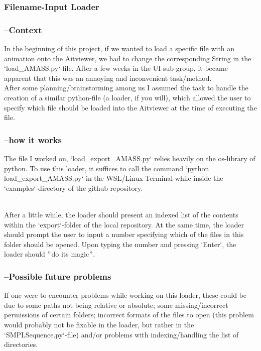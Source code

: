 \documentclass[a4paper]{scrartcl}
\begin{document}
\subsubsection*{Filename-Input Loader}
\subsubsection*{--Context}
In the beginning of this project, if we wanted to load a specific file with an animation onto the Aitviewer, we had to change the corresponding String in the `load\_AMASS.py`-file. After a few weeks in the UI sub-group, it became apparent that this was an annoying and inconvenient task/method.
\\
After some planning/brainstorming among us I assumed the task to handle the creation of a similar python-file (a loader, if you will), which allowed the user to specify which file should be loaded into the Aitviewer at the time of executing the file.

\subsubsection*{--how it works}
The file I worked on, `load\_export\_AMASS.py` relies heavily on the os-library of python.
To use this loader, it suffices to call the command `python load\_export\_AMASS.py` in the WSL/Linux Terminal while inside the `examples`-directory of the github repository.

\\
After a little while, the loader should present an indexed list of the contents within the `export`-folder of the local repository. At the same time, the loader should prompt the user to input a number specifying which of the files in this folder should be opened. Upon typing the number and pressing `Enter`, the loader should $"$do its magic$"$.

\subsubsection*{--Possible future problems}
If one were to encounter problems while working on this loader, these could be due to some paths not being relative or absolute; some missing/incorrect permissions of certain folders; incorrect formats of the files to open (this problem would probably not be fixable in the loader, but rather in the `SMPLSequence.py`-file) and/or problems with indexing/handling the list of directories.
\end{document}
